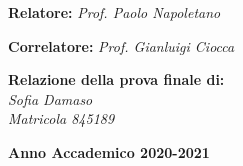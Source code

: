 \begin{titlepage}
        \vspace{30mm}
 
  \begin{flushleft}
  \noindent
  {\large \textbf{Relatore:} \textit{Prof. Paolo Napoletano} }
  \vspace{1\baselineskip}
  
  \noindent
  {\large \textbf{Correlatore:} \textit{Prof. Gianluigi Ciocca}}
  \end{flushleft}
  \vspace{15mm}

  \begin{flushright}
  
    \textbf{\large Relazione della prova finale di:} \\
    \large{\textit{Sofia Damaso}}\\
    \large{\textit{Matricola 845189}}
  \end{flushright}
  
  \vspace{40mm}
  \begin{center}
    {\large{\bf Anno Accademico 2020-2021}}
  \end{center}
  
\end{titlepage}
\restoregeometry
